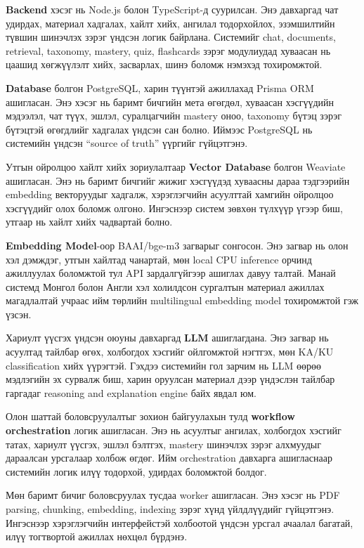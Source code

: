 \documentclass[12pt,A4]{report}
\newcommand{\eng}[1]{#1}
\begin{document}
\textbf{\eng{Backend}} хэсэг нь \eng{Node.js} болон \eng{TypeScript}-д суурилсан. Энэ давхаргад чат удирдах, материал хадгалах, хайлт хийх, ангилал тодорхойлох, эзэмшилтийн түвшин шинэчлэх зэрэг үндсэн логик байрлана. Системийг \eng{chat}, \eng{documents}, \eng{retrieval}, \eng{taxonomy}, \eng{mastery}, \eng{quiz}, \eng{flashcards} зэрэг модулиудад хуваасан нь цаашид хөгжүүлэлт хийх, засварлах, шинэ боломж нэмэхэд тохиромжтой.

\textbf{\eng{Database}} болгон \eng{PostgreSQL}, харин түүнтэй ажиллахад \eng{Prisma ORM} ашигласан. Энэ хэсэг нь баримт бичгийн мета өгөгдөл, хуваасан хэсгүүдийн мэдээлэл, чат түүх, эшлэл, суралцагчийн \eng{mastery} оноо, \eng{taxonomy} бүтэц зэрэг бүтэцтэй өгөгдлийг хадгалах үндсэн сан болно. Иймээс \eng{PostgreSQL} нь системийн үндсэн ``source of truth'' үүргийг гүйцэтгэнэ.

Утгын ойролцоо хайлт хийх зориулалтаар \textbf{\eng{Vector Database}} болгон \eng{Weaviate} ашигласан. Энэ нь баримт бичгийг жижиг хэсгүүдэд хуваасны дараа тэдгээрийн \eng{embedding} векторуудыг хадгалж, хэрэглэгчийн асуулттай хамгийн ойролцоо хэсгүүдийг олох боломж олгоно. Ингэснээр систем зөвхөн түлхүүр үгээр биш, утгаар нь хайлт хийх чадвартай болно.

\textbf{\eng{Embedding Model}}-оор \eng{BAAI/bge-m3} загварыг сонгосон. Энэ загвар нь олон хэл дэмждэг, утгын хайлтад чанартай, мөн \eng{local CPU inference} орчинд ажиллуулах боломжтой тул API зардалгүйгээр ашиглах давуу талтай. Манай системд Монгол болон Англи хэл холилдсон сургалтын материал ажиллах магадлалтай учраас ийм төрлийн \eng{multilingual embedding model} тохиромжтой гэж үзсэн.

Хариулт үүсгэх үндсэн оюуны давхаргад \textbf{\eng{LLM}} ашиглагдана. Энэ загвар нь асуултад тайлбар өгөх, холбогдох хэсгийг ойлгомжтой нэгтгэх, мөн \eng{KA/KU classification} хийх үүрэгтэй. Гэхдээ системийн гол зарчим нь \eng{LLM} өөрөө мэдлэгийн эх сурвалж биш, харин оруулсан материал дээр үндэслэн тайлбар гаргадаг \eng{reasoning and explanation engine} байх явдал юм.

Олон шаттай боловсруулалтыг зохион байгуулахын тулд \textbf{workflow orchestration} логик ашигласан. Энэ нь асуултыг ангилах, холбогдох хэсгийг татах, хариулт үүсгэх, эшлэл бэлтгэх, \eng{mastery} шинэчлэх зэрэг алхмуудыг дараалсан урсгалаар холбож өгдөг. Ийм \eng{orchestration} давхарга ашигласнаар системийн логик илүү тодорхой, удирдах боломжтой болдог.

Мөн баримт бичиг боловсруулах тусдаа \eng{worker} ашигласан. Энэ хэсэг нь \eng{PDF parsing}, \eng{chunking}, \eng{embedding}, \eng{indexing} зэрэг хүнд үйлдлүүдийг гүйцэтгэнэ. Ингэснээр хэрэглэгчийн интерфейстэй холбоотой үндсэн урсгал ачаалал багатай, илүү тогтвортой ажиллах нөхцөл бүрдэнэ.
\end{document}
